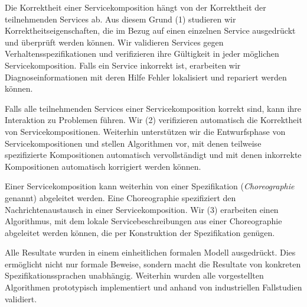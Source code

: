 Die Korrektheit einer Servicekomposition h\"angt von der Korrektheit der teilnehmenden Services ab. Aus diesem Grund (1) studieren wir Korrektheitseigenschaften, die im Bezug auf einen einzelnen Service ausgedr\"uckt und \"uberpr\"uft werden k\"onnen. Wir validieren Services gegen Verhaltensspezifikationen und verifizieren ihre G\"ultigkeit in jeder m\"oglichen Servicekomposition. Falls ein Service inkorrekt ist, erarbeiten wir Diagnoseinformationen mit deren Hilfe Fehler lokalisiert und repariert werden k\"onnen.

Falls alle teilnehmenden Services einer Servicekomposition korrekt sind, kann ihre Interaktion zu Problemen f\"uhren. Wir (2) verifizieren automatisch die Korrektheit von Servicekompositionen. Weiterhin unterst\"utzen wir die Entwurfsphase von Servicekompositionen und stellen Algorithmen vor, mit denen teilweise spezifizierte Kompositionen automatisch vervollst\"andigt und mit denen inkorrekte Kompositionen automatisch korrigiert werden k\"onnen.

Einer Servicekomposition kann weiterhin von einer Spezifikation (\emph{Choreographie} genannt) abgeleitet werden. Eine Choreographie spezifiziert den Nachrichtenaustausch in einer Servicekomposition. Wir (3) erarbeiten einen Algorithmus, mit dem lokale Servicebeschreibungen aus einer Choreographie abgeleitet werden k\"onnen, die per Konstruktion der Spezifikation gen\"ugen.

Alle Resultate wurden in einem einheitlichen formalen Modell ausgedr\"uckt. Dies erm\"oglicht nicht nur formale Beweise, sondern macht die Resultate von konkreten Spezifikationssprachen unabh\"angig. Weiterhin wurden alle vorgestellten Algorithmen prototypisch implementiert und anhand von industriellen Fallstudien validiert.


\endgroup
